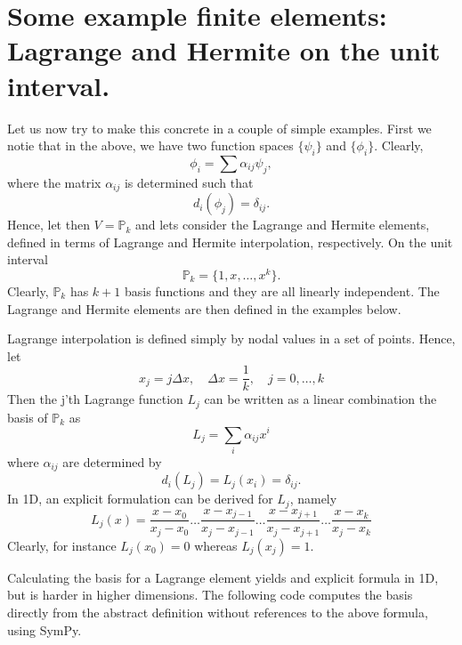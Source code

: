\section{Some example finite elements: Lagrange and Hermite on the unit interval. }
Let us now try to make this concrete in a couple of simple examples. First we notie that  
in the above, we have two function spaces $\{\psi_i\}$ and $\{\phi_i\}$. Clearly, 
\[
\phi_i = \sum \alpha_{ij}\psi_j,  
\]
where the matrix $\alpha_{ij}$ is determined such that 
\[
d_i(\phi_j) = \delta_{ij}. 
\]
Hence, let then $V=\mathbb{P}_k$ and lets consider the Lagrange and Hermite elements, defined in terms
of Lagrange and Hermite interpolation, respectively.  
On the unit interval
\[
\mathbb{P}_k = \{1, x, \ldots, x^k\}. 
\]
Clearly, $\mathbb{P}_k$ has $k+1$ basis functions  and they are all linearly independent. 
The Lagrange and Hermite elements are then defined in the examples below. 
\begin{exmp}
\label{lagrange:element}
Lagrange interpolation is defined simply by nodal values in a set of points. Hence, 
let 
\[
x_j = j \Delta x, \quad \Delta x = \frac{1}{k}, \quad  j= 0, \dots, k 
\]
Then the j'th Lagrange function $L_j$ can be written as a linear combination the basis of $\mathbb{P}_k$ as 
\[ 
L_j = \sum_i \alpha_{ij} x^i 
\]
where $\alpha_{ij}$ are determined by 
\[ 
d_i(L_j) = L_j(x_i) = \delta_{ij} . 
\]
In 1D, an explicit formulation can be derived for $L_j$, namely 
\[
L_j(x) = \frac{x-x_0}{x_j-x_0} \ldots \frac{x-x_{j-1}}{x_j-x_{j-1}} \ldots \frac{x-x_{j+1}}{x_j-x_{j+1}} \ldots \frac{x-x_k}{x_j-x_k}  
\]
Clearly, for instance $L_j(x_0) = 0$ whereas  $L_j(x_j) = 1$.  
\end{exmp}
Calculating the basis for a Lagrange element yields and explicit formula in 1D, but is harder in higher dimensions.
The following code computes the basis directly from the abstract definition without references to the above formula, using SymPy.  
